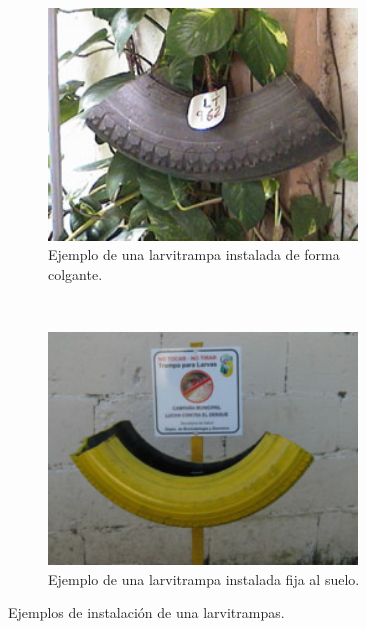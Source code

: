 \begin{figure}[!htbp]
    \centering
    \begin{subfigure}[b]{0.45\textwidth}
        \includegraphics[width=0.9\textwidth]{anexos/graphics/ej1-larvitrampa.png}
        \caption{\label{fig:anexo-disenho-1}Ejemplo de una larvitrampa instalada de forma colgante.}
    \end{subfigure}
    ~~~~
    \begin{subfigure}[b]{0.45\textwidth}
        \includegraphics[width=0.9\textwidth]{anexos/graphics/ej2-larvitrampa.png}
        \caption{\label{fig:anexo-disenho-2} Ejemplo de una larvitrampa instalada fija al suelo.}
    \end{subfigure}
    \caption{\label{fig:instalacion-larvitrampas} Ejemplos de instalación de una larvitrampas.}
\end{figure}

